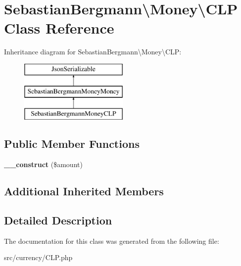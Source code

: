 \hypertarget{classSebastianBergmann_1_1Money_1_1CLP}{}\section{Sebastian\+Bergmann\textbackslash{}Money\textbackslash{}C\+L\+P Class Reference}
\label{classSebastianBergmann_1_1Money_1_1CLP}
Inheritance diagram for Sebastian\+Bergmann\textbackslash{}Money\textbackslash{}C\+L\+P\+:\begin{figure}[H]
\begin{center}
\leavevmode
\includegraphics[height=3.000000cm]{classSebastianBergmann_1_1Money_1_1CLP}
\end{center}
\end{figure}
\subsection*{Public Member Functions}
\begin{DoxyCompactItemize}
\item 
\hypertarget{classSebastianBergmann_1_1Money_1_1CLP_a07a963fa33bf5d450c1165d06c52cc4f}{}{\bfseries \+\_\+\+\_\+construct} (\$amount)\label{classSebastianBergmann_1_1Money_1_1CLP_a07a963fa33bf5d450c1165d06c52cc4f}

\end{DoxyCompactItemize}
\subsection*{Additional Inherited Members}


\subsection{Detailed Description}


The documentation for this class was generated from the following file\+:\begin{DoxyCompactItemize}
\item 
src/currency/C\+L\+P.\+php\end{DoxyCompactItemize}
